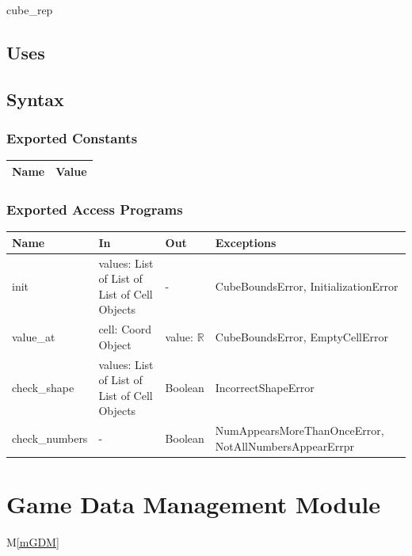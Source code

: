 \documentclass[12pt, titlepage]{article}
\newcommand{\mref}[1]{M\ref{#1}}
\begin{document}
cube\_rep

\subsection{Uses}


\subsection{Syntax}

\subsubsection{Exported Constants}

\begin{center}
\begin{tabular}{p{10cm} p{4cm}}
\hline
\textbf{Name} & \textbf{Value}\\
\hline


\hline
\end{tabular}
\end{center}

\subsubsection{Exported Access Programs}

\begin{center}
\begin{tabular}{p{4cm} p{4cm} p{4cm} p{4cm}}
\hline
\textbf{Name} & \textbf{In} & \textbf{Out} & \textbf{Exceptions} \\
\hline
init & values: List of List of List of Cell Objects  & - & CubeBoundsError, InitializationError \\
value\_at & cell: Coord Object  & value: $\mathbb{R}$ & CubeBoundsError, EmptyCellError \\
check\_shape & values: List of List of List of Cell Objects & Boolean & IncorrectShapeError\\
check\_numbers & - & Boolean & NumAppearsMoreThanOnceError, NotAllNumbersAppearErrpr\\
\hline
\end{tabular}
\end{center}

\newpage

\section{Game Data Management Module} \mref{mGDM} 
\end{document}
